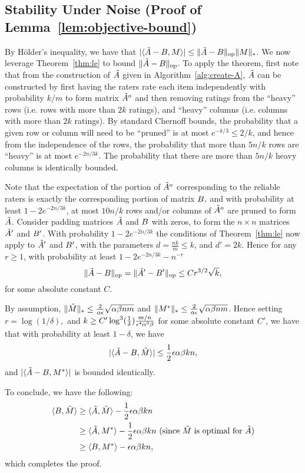 \subsection{Stability Under Noise (Proof of Lemma~\ref{lem:objective-bound})}
\label{sec:objective-bound-proof}

By H\"{o}lder's inequality, we have that $|\langle \tilde{A}-B, M \rangle| \leq \|\tilde{A}-B\|_{\mathrm{op}}\|M\|_*$.   We now leverage Theorem~\ref{thm:le} to bound $\|\tilde{A}-B\|_{\mathrm{op}}$.  To apply the theorem, first note that from the construction of $\tilde{A}$ given in Algorithm~\ref{alg:create-A}, $\tilde{A}$ can be constructed by first having the raters rate each item independently with probability $k/m$ to form matrix $\tilde{A}^o$ and then removing ratings from the ``heavy'' rows (i.e. rows with more than $2k$ ratings), and ``heavy'' columns (i.e. columns with more than $2k$ ratings).  By standard Chernoff bounds, the probability that a given row or column will need to be ``pruned'' is at most $e^{-k/3} \le 2/k$, and hence from the independence of the rows, the probability that more than $5n/k$ rows are ``heavy'' is at most $e^{-2n/3k}$.  The probability that there are more than $5n/k$ heavy columns is identically bounded.

 Note that the expectation of the portion of $\tilde{A}^o$ corresponding to the reliable raters is exactly the corresponding portion of matrix $B,$ and with probability at least $1-2e^{-2n/3k}$, at most $10 n/k$ rows and/or columns of $\tilde{A}^o$ are pruned to form $\tilde{A}$.  Consider padding matrices $\tilde{A}$ and $B$ with zeros, to form the $n \times n$ matrices $\tilde{A}'$ and $B'$.   With probability $1-2e^{-2n/3k}$ the conditions of Theorem~\ref{thm:le} now apply to $\tilde{A}'$ and $B'$, with the parameters $d = \frac{n k}{m} \le k$, and $d' =  2k$.  Hence for any $r \ge 1$, with probability at least $1-2e^{-2n/3k} -n^{-r}$ $$\|\tilde{A}-B\|_{\mathrm{op}} = \|\tilde{A}'-B'\|_{\mathrm{op}} \le C r^{3/2} \sqrt{k},$$ for some absolute constant $C$.  

By assumption, $\|\tilde{M}\|_* \le \frac{2}{\alpha \epsilon}\sqrt{\alpha \beta n m}$ and $\|M^*\|_* \le \frac{2}{\alpha \epsilon}\sqrt{\alpha \beta n m}$.   Hence setting $r= \log (1/\delta),$ and $k \ge C' \log^3(\frac{1}{\delta}) \frac{m/n}{\epsilon^4 \alpha^3 \beta}$ for some absolute constant $C'$, we have that with probability at least $1-\delta$, we have $$|\langle \tilde{A}-B, \tilde{M} \rangle|  \le \frac{1}{2} \epsilon \alpha \beta k n,$$ and $|\langle \tilde{A}-B, M^* \rangle|$ is bounded identically.

To conclude, we have the following:
\begin{align}
\langle B, \tilde{M} \rangle  &\geq \langle \tilde{A}, \tilde{M} \rangle - \frac{1}{2}\epsilon \alpha \beta k n \\
 &\geq \langle \tilde{A}, M^* \rangle - \frac{1}{2} \epsilon \alpha \beta k n \text{ (since $\tilde{M}$ is optimal for $\tilde{A}$)} \\
 &\geq \langle B, M^* \rangle - \epsilon \alpha \beta k n,
\end{align}
which completes the proof.


